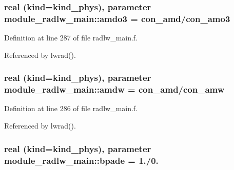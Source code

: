 \subsubsection[{\texorpdfstring{amdo3}{amdo3}}]{\setlength{\rightskip}{0pt plus 5cm}real (kind=kind\+\_\+phys), parameter module\+\_\+radlw\+\_\+main\+::amdo3 = con\+\_\+amd/con\+\_\+amo3\hspace{0.3cm}{\ttfamily [private]}}\hypertarget{group__module__radlw__main_ga06f62c34722a3d7dcec9b5643d78f039}{}\label{group__module__radlw__main_ga06f62c34722a3d7dcec9b5643d78f039}


Definition at line 287 of file radlw\+\_\+main.\+f.



Referenced by lwrad().

\subsubsection[{\texorpdfstring{amdw}{amdw}}]{\setlength{\rightskip}{0pt plus 5cm}real (kind=kind\+\_\+phys), parameter module\+\_\+radlw\+\_\+main\+::amdw = con\+\_\+amd/con\+\_\+amw\hspace{0.3cm}{\ttfamily [private]}}\hypertarget{group__module__radlw__main_ga9845c3a6eaa014e6a310fe1436162e37}{}\label{group__module__radlw__main_ga9845c3a6eaa014e6a310fe1436162e37}


Definition at line 286 of file radlw\+\_\+main.\+f.



Referenced by lwrad().

\subsubsection[{\texorpdfstring{bpade}{bpade}}]{\setlength{\rightskip}{0pt plus 5cm}real (kind=kind\+\_\+phys), parameter module\+\_\+radlw\+\_\+main\+::bpade = 1./0.\hspace{0.3cm}{\ttfamily [private]}}\hypertarget{group__module__radlw__main_ga5c63b9836ad5735dd3d0811ff527c41c}{}\label{group__module__radlw__main_ga5c63b9836ad5735dd3d0811ff527c41c}



